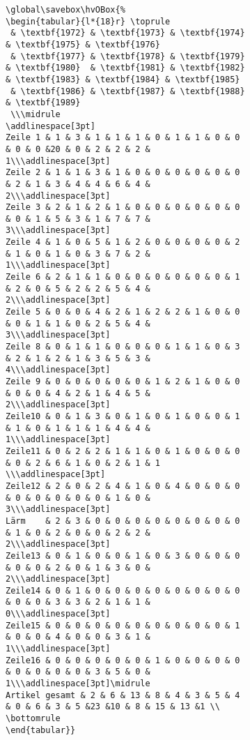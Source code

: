 \documentclass[twoside,paper=a4,usegeometry,index=totoc]{scrartcl}
\begin{document}
\begin{figure}[p]
\begin{figure}[p]
\begin{lstlisting}[basicstyle=\footnotesize\ttfamily]
\global\savebox\hvOBox{%
\begin{tabular}{l*{18}r} \toprule
 & \textbf{1972} & \textbf{1973} & \textbf{1974} & \textbf{1975} & \textbf{1976} 
 & \textbf{1977} & \textbf{1978} & \textbf{1979} & \textbf{1980}  & \textbf{1981} & \textbf{1982} & \textbf{1983} & \textbf{1984} & \textbf{1985}
 & \textbf{1986} & \textbf{1987} & \textbf{1988} & \textbf{1989}
 \\\midrule
\addlinespace[3pt]
Zeile 1 & 1 & 3 & 1 & 1 & 1 & 0 & 1 & 1 & 0 & 0 & 0 & 0 &20 & 0 & 2 & 2 & 2 & 1\\\addlinespace[3pt]
Zeile 2 & 1 & 1 & 3 & 1 & 0 & 0 & 0 & 0 & 0 & 0 & 2 & 1 & 3 & 4 & 4 & 6 & 4 & 2\\\addlinespace[3pt]
Zeile 3 & 2 & 1 & 2 & 1 & 0 & 0 & 0 & 0 & 0 & 0 & 0 & 1 & 5 & 3 & 1 & 7 & 7 & 3\\\addlinespace[3pt]
Zeile 4 & 1 & 0 & 5 & 1 & 2 & 0 & 0 & 0 & 0 & 2 & 1 & 0 & 1 & 0 & 3 & 7 & 2 & 1\\\addlinespace[3pt]
Zeile 6 & 2 & 1 & 1 & 0 & 0 & 0 & 0 & 0 & 0 & 1 & 2 & 0 & 5 & 2 & 2 & 5 & 4 & 2\\\addlinespace[3pt]
Zeile 5 & 0 & 0 & 4 & 2 & 1 & 2 & 2 & 1 & 0 & 0 & 0 & 1 & 1 & 0 & 2 & 5 & 4 & 3\\\addlinespace[3pt]
Zeile 8 & 0 & 1 & 1 & 0 & 0 & 0 & 1 & 1 & 0 & 3 & 2 & 1 & 2 & 1 & 3 & 5 & 3 & 4\\\addlinespace[3pt]
Zeile 9 & 0 & 0 & 0 & 0 & 0 & 1 & 2 & 1 & 0 & 0 & 0 & 0 & 4 & 2 & 1 & 4 & 5 & 2\\\addlinespace[3pt]
Zeile10 & 0 & 1 & 3 & 0 & 1 & 0 & 1 & 0 & 0 & 1 & 1 & 0 & 1 & 1 & 1 & 4 & 4 & 1\\\addlinespace[3pt]
Zeile11 & 0 & 2 & 2 & 1 & 1 & 0 & 1 & 0 & 0 & 0 & 0 & 2 & 6 & 1 & 0 & 2 & 1 & 1 \\\addlinespace[3pt]
Zeile12 & 2 & 0 & 2 & 4 & 1 & 0 & 4 & 0 & 0 & 0 & 0 & 0 & 0 & 0 & 0 & 1 & 0 & 3\\\addlinespace[3pt]
Lärm    & 2 & 3 & 0 & 0 & 0 & 0 & 0 & 0 & 0 & 0 & 1 & 0 & 2 & 0 & 0 & 2 & 2 & 2\\\addlinespace[3pt]
Zeile13 & 0 & 1 & 0 & 0 & 1 & 0 & 3 & 0 & 0 & 0 & 0 & 0 & 2 & 0 & 1 & 3 & 0 & 2\\\addlinespace[3pt]
Zeile14 & 0 & 1 & 0 & 0 & 0 & 0 & 0 & 0 & 0 & 0 & 0 & 0 & 3 & 3 & 2 & 1 & 1 & 0\\\addlinespace[3pt]
Zeile15 & 0 & 0 & 0 & 0 & 0 & 0 & 0 & 0 & 0 & 1 & 0 & 0 & 4 & 0 & 0 & 3 & 1 & 1\\\addlinespace[3pt]
Zeile16 & 0 & 0 & 0 & 0 & 0 & 1 & 0 & 0 & 0 & 0 & 0 & 0 & 0 & 0 & 3 & 5 & 0 & 1\\\addlinespace[3pt]\midrule
Artikel gesamt & 2 & 6 & 13 & 8 & 4 & 3 & 5 & 4 & 0 & 6 & 3 & 5 &23 &10 & 8 & 15 & 13 &1 \\
\bottomrule
\end{tabular}}


\end{lstlisting}
\end{figure}
\end{figure}
\end{document}
